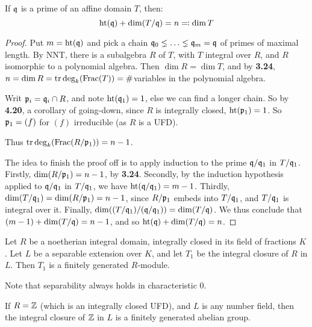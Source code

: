 \documentclass[10pt,a4paper]{article}
\begin{document}
\begin{corollary}
  If $\mathfrak{q}$ is a prime of an affine domain $T$, then:
  \[\operatorname{ht}(\mathfrak{q}) +\dim(T/\mathfrak{q}) = n \eqqcolon \dim T\]
\end{corollary}
\begin{proof}
  Put $m = \operatorname{ht}(\mathfrak{q})$ and pick a chain $\mathfrak{q}_0 \lneq \ldots \lneq \mathfrak{q}_m = \mathfrak{q}$ of primes of maximal length. By NNT, there is a subalgebra $R$ of $T$, with $T$ integral over $R$, and $R$ isomorphic to a polynomial algebra. Then $\dim R = \dim T$, and by \textbf{3.24}, $n = \dim R = \operatorname{tr}\deg_k(\operatorname{Frac}(T)) = \#$variables in the polynomial algebra.

  Writ $\mathfrak{p}_i = \mathfrak{q}_i \cap R$, and note $\operatorname{ht}(\mathfrak{q}_1) = 1$, else we can find a longer chain. So by \textbf{4.20}, a corollary of going-down, since $R$ is integrally closed, $\operatorname{ht}(\mathfrak{p}_1) = 1$. So $\mathfrak{p}_1 = (f)$ for $(f)$ irreducible (as $R$ is a UFD).

  Thus $\operatorname{tr}\deg_k(\operatorname{Frac}(R/\mathfrak{p}_1)) = n-1$.

  The idea to finish the proof off is to apply induction to the prime $\mathfrak{q}/\mathfrak{q}_1$ in $T/\mathfrak{q}_1$. Firstly, $\dim (R/\mathfrak{p}_1) = n-1$, by \textbf{3.24}. Secondly, by the induction hypothesis applied to $\mathfrak{q}/\mathfrak{q}_1$ in $T/\mathfrak{q}_1$, we have $\operatorname{ht}(\mathfrak{q}/\mathfrak{q}_1) = m-1$. Thirdly, $\dim(T/\mathfrak{q}_1) = \dim(R/\mathfrak{p}_1) = n-1$, since $R/\mathfrak{p}_1$ embeds into $T/\mathfrak{q}_1$, and $T/\mathfrak{q}_1$ is integral over it. Finally, $\dim((T/\mathfrak{q}_1)/(\mathfrak{q}/\mathfrak{q}_1)) = \dim(T/\mathfrak{q})$. We thus conclude that $(m-1) + \dim(T/\mathfrak{q}) = n-1$, and so $\operatorname{ht}(\mathfrak{q}) + \dim(T/\mathfrak{q}) = n$.
\end{proof}
\begin{theorem}
  Let $R$ be a noetherian integral domain, integrally closed in its field of fractions $K$. Let $L$ be a separable extension over $K$, and let $T_1$ be the integral closure of $R$ in $L$. Then $T_1$ is a finitely generated $R$-module.
\end{theorem}
Note that separability always holds in characteristic 0.
\begin{corollary}
  If $R = \mathbb{Z}$ (which is an integrally closed UFD), and $L$ is any number field, then the integral closure of $\mathbb{Z}$ in $L$ is a finitely generated abelian group.
\end{corollary}
\end{document}
